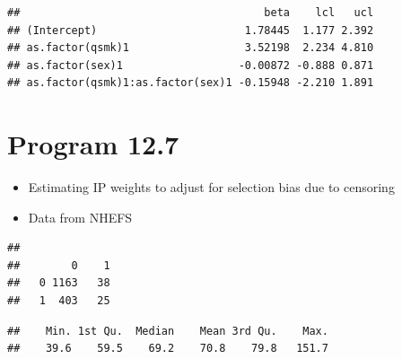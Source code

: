 \documentclass[
  10pt,
]{book}
\newenvironment{Shaded}{\begin{snugshade}}{\end{snugshade}}
\newcommand{\DecValTok}[1]{\textcolor[rgb]{0.00,0.00,0.81}{#1}}
\newcommand{\KeywordTok}[1]{\textcolor[rgb]{0.13,0.29,0.53}{\textbf{#1}}}
\newcommand{\NormalTok}[1]{#1}
\newcommand{\OperatorTok}[1]{\textcolor[rgb]{0.81,0.36,0.00}{\textbf{#1}}}
\newcommand{\StringTok}[1]{\textcolor[rgb]{0.31,0.60,0.02}{#1}}
\providecommand{\tightlist}{%
  \setlength{\itemsep}{0pt}\setlength{\parskip}{0pt}}
\begin{document}
\begin{verbatim}
##                                      beta    lcl   ucl
## (Intercept)                       1.78445  1.177 2.392
## as.factor(qsmk)1                  3.52198  2.234 4.810
## as.factor(sex)1                  -0.00872 -0.888 0.871
## as.factor(qsmk)1:as.factor(sex)1 -0.15948 -2.210 1.891
\end{verbatim}

\hypertarget{program-12.7}{%
\section{Program 12.7}\label{program-12.7}}

\begin{itemize}
\tightlist
\item
  Estimating IP weights to adjust for selection bias due to censoring
\item
  Data from NHEFS
\end{itemize}

\begin{Shaded}
\end{Shaded}

\begin{verbatim}
##    
##        0    1
##   0 1163   38
##   1  403   25
\end{verbatim}

\begin{Shaded}
\end{Shaded}

\begin{verbatim}
##    Min. 1st Qu.  Median    Mean 3rd Qu.    Max. 
##    39.6    59.5    69.2    70.8    79.8   151.7
\end{verbatim}

\begin{Shaded}
\end{Shaded}
\end{document}
